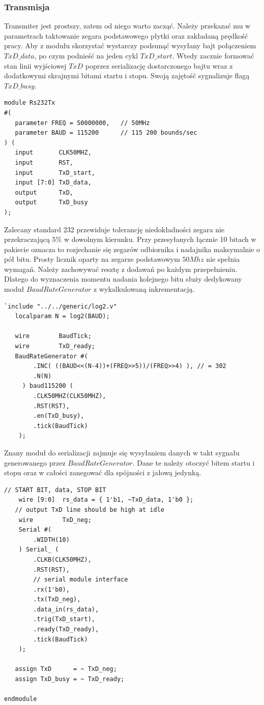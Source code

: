 \documentclass[a4paper,12pt]{article}
\begin{document}
\subsubsection{Transmisja}
Transmiter jest prostszy, zatem od niego warto zacząć. Należy przekazać mu w parametrach taktowanie zegara podstawowego płytki oraz zakładaną prędkość pracy. Aby z modułu skorzystać wystarczy podsunąć wysyłany bajt połączeniem $TxD\_data$, po czym podnieść na jeden cykl $TxD\_start$. Wtedy zacznie formować stan linii wyjściowej $TxD$ poprzez serializację dostarczonego bajtu wraz z dodatkowymi skrajnymi bitami startu i stopu. Swoją zajętość sygnalizuje flagą $TxD\_busy$.
\begin{lstlisting}[label=Rs232Tx,caption=Rs232Tx.v]
module Rs232Tx
#(
   parameter FREQ = 50000000,   // 50MHz
   parameter BAUD = 115200      // 115 200 bounds/sec
) (
   input       CLK50MHZ,
   input       RST,
   input       TxD_start,
   input [7:0] TxD_data,
   output      TxD,
   output      TxD_busy
);
\end{lstlisting}

Zalecany standard 232 przewiduje tolerancję niedokładności zegara nie przekraczającą $5\%$ w dowolnym kierunku. Przy przesyłanych łącznie 10 bitach w pakiecie oznacza to rozjechanie się zegarów odbiornika i nadajnika maksymalnie o pół bitu. Prosty licznik oparty na zegarze podstawowym $50Mhz$ nie spełnia wymagań. Należy zachowywać resztę z dodawań po każdym przepełnieniu. Dlatego do wyznaczenia momentu nadania kolejnego bitu służy dedykowany moduł $BaudRateGenerator$ z wykalkulowaną inkrementacją.
\begin{lstlisting}[label=Rs232Tx,caption=Rs232Tx.v,firstnumber=14]
   `include "../../generic/log2.v"
   localparam N = log2(BAUD);

   wire        BaudTick;
   wire        TxD_ready;
   BaudRateGenerator #(
        .INC( ((BAUD<<(N-4))+(FREQ>>5))/(FREQ>>4) ), // = 302
        .N(N)
     ) baud115200 (
        .CLK50MHZ(CLK50MHZ),
        .RST(RST),
        .en(TxD_busy),
        .tick(BaudTick)
    );
\end{lstlisting}

Znany moduł do serializacji zajmuje się wysyłaniem danych w takt sygnału generowanego przez $BaudRateGenerator$. Dane te należy otoczyć bitem startu i stopu oraz w całości zanegować dla spójności z jałową jedynką.
\begin{lstlisting}[label=Rs232Tx,caption=Rs232Tx.v,firstnumber=29]
    // START BIT, data, STOP BIT
    wire [9:0]  rs_data = { 1'b1, ~TxD_data, 1'b0 };
   // output TxD line should be high at idle
    wire        TxD_neg;
    Serial #(
        .WIDTH(10)
    ) Serial_ (
        .CLKB(CLK50MHZ),
        .RST(RST),
        // serial module interface
        .rx(1'b0),
        .tx(TxD_neg),
        .data_in(rs_data),
        .trig(TxD_start),
        .ready(TxD_ready),
        .tick(BaudTick)
    );

   assign TxD      = ~ TxD_neg;
   assign TxD_busy = ~ TxD_ready;

endmodule
\end{lstlisting}
\end{document}
